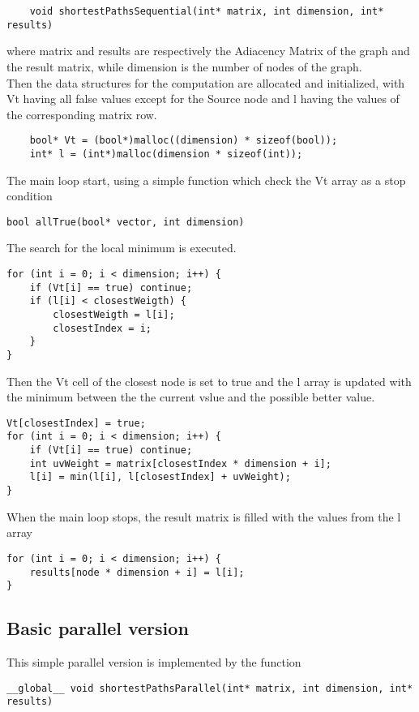 \documentclass[
	a4paper, %
	12pt, %
]{class}
\begin{document}
\begin{verbatim}
    void shortestPathsSequential(int* matrix, int dimension, int* results)
\end{verbatim}

where matrix and results are respectively the Adiacency Matrix of the graph and the result matrix, while dimension is the number
of nodes of the graph.\\

Then the data structures for the computation are allocated and initialized, with Vt having all false values except for the Source node
and l having the values of the corresponding matrix row.
\begin{verbatim}
    bool* Vt = (bool*)malloc((dimension) * sizeof(bool));
    int* l = (int*)malloc(dimension * sizeof(int));
\end{verbatim}

The main loop start, using a simple function which check the Vt array as a stop condition
\begin{verbatim}
bool allTrue(bool* vector, int dimension)
\end{verbatim}

The search for the local minimum is executed.
\begin{verbatim}
for (int i = 0; i < dimension; i++) {
    if (Vt[i] == true) continue;
    if (l[i] < closestWeigth) {
        closestWeigth = l[i];
        closestIndex = i;
    }
}
\end{verbatim}

Then the Vt cell of the closest node is set to true and the l array is updated with the minimum between the the current vslue and the
possible better value.
\begin{verbatim}
Vt[closestIndex] = true;
for (int i = 0; i < dimension; i++) {
    if (Vt[i] == true) continue;
    int uvWeight = matrix[closestIndex * dimension + i];
    l[i] = min(l[i], l[closestIndex] + uvWeight);
}
\end{verbatim}

When the main loop stops, the result matrix is filled with the values from the l array
\begin{verbatim}
for (int i = 0; i < dimension; i++) {
    results[node * dimension + i] = l[i];
}
\end{verbatim}

\subsection{Basic parallel version}
This simple parallel version is implemented by the function
\begin{verbatim}
__global__ void shortestPathsParallel(int* matrix, int dimension, int* results)
\end{verbatim}
\end{document}
